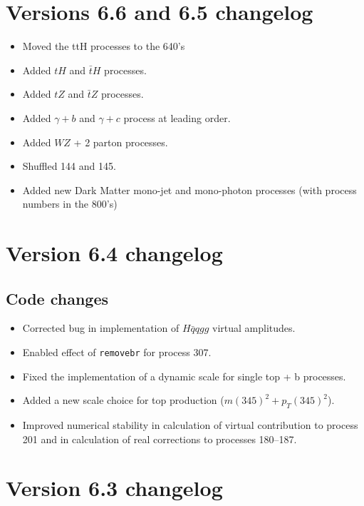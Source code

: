 \documentclass{article}
\begin{document}
{{{{{{\section{Versions 6.6 and 6.5 changelog}
\label{changelog6.5}
\begin{itemize}
\item Moved the ttH processes to the 640's
\item Added $tH$ and $\bar{t}H$  processes.
\item Added $tZ$ and $\bar{t}Z$  processes.
\item Added $\gamma+b$ and $\gamma+c$ process at leading order.
\item Added $W Z $ + 2 parton processes.
\item Shuffled 144 and 145.
\item Added new Dark Matter mono-jet and mono-photon processes (with process numbers in the 800's) 
\end{itemize}

\section{Version 6.4 changelog}
\label{changelog6.4}

\subsection{Code changes}
\begin{itemize}
\item Corrected bug in implementation of $H\bar q q gg$ virtual amplitudes.
\item Enabled effect of {\tt removebr} for process 307.
\item Fixed the implementation of a dynamic scale for single top + b processes.
\item Added a new scale choice for top production ($m(345)^2+p_T(345)^2$).
\item Improved numerical stability in calculation of virtual contribution to process
201 and in calculation of real corrections to processes 180--187.  
\end{itemize}

\section{Version 6.3 changelog}
\label{changelog6.3}

}}}}}}
\end{document}
